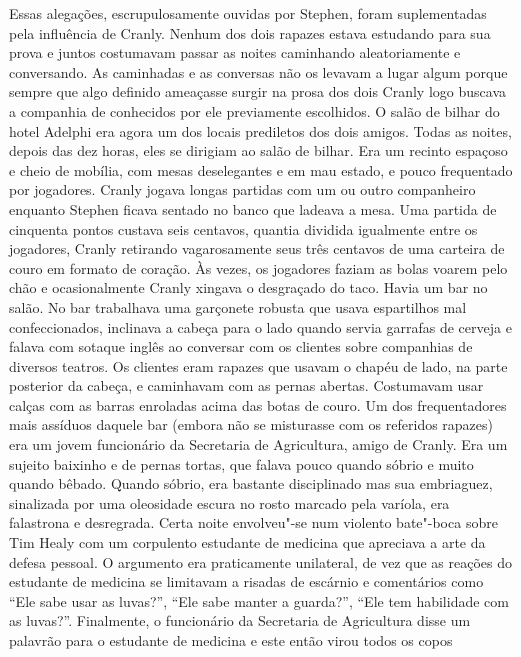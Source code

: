 Essas alegações, escrupulosamente ouvidas por Stephen, foram
suplementadas pela influência de Cranly.  Nenhum dos dois rapazes
estava estudando para sua prova e juntos costumavam
passar as noites caminhando aleatoriamente e conversando.  As
caminhadas e as conversas não os levavam a lugar algum porque sempre
que algo definido ameaçasse surgir na prosa dos dois Cranly logo
buscava a companhia de conhecidos por ele previamente escolhidos.  O
salão de bilhar do hotel Adelphi era agora um dos locais prediletos dos
dois amigos.  Todas as noites, depois das dez horas, eles se dirigiam
ao salão de bilhar.  Era um recinto espaçoso e cheio de mobília, com
mesas deselegantes e em mau estado, e pouco frequentado por jogadores. 
Cranly jogava longas partidas com um ou outro companheiro enquanto
Stephen ficava sentado no banco que ladeava a mesa.  Uma partida de
cinquenta pontos custava seis centavos, quantia dividida igualmente
entre os jogadores, Cranly retirando \label{vagarosamente"-seus} vagarosamente seus três centavos
de uma carteira de couro em formato de coração.  Às vezes, os jogadores
faziam as bolas voarem pelo chão e ocasionalmente Cranly xingava o
desgraçado do taco.  Havia um bar no salão.  No bar trabalhava uma
garçonete robusta que usava espartilhos mal confeccionados, inclinava a
cabeça para o lado quando servia garrafas de cerveja e falava com
sotaque inglês ao conversar com os clientes sobre companhias de
diversos teatros.  Os clientes eram rapazes que usavam o chapéu de
lado, na parte posterior da cabeça, e caminhavam com as pernas abertas.
 Costumavam usar calças com as barras enroladas acima das botas de
couro.  Um dos frequentadores mais assíduos daquele bar (embora não se
misturasse com os referidos rapazes) era um jovem funcionário da
Secretaria de Agricultura, amigo de Cranly.  Era um sujeito baixinho e
de pernas tortas, que falava pouco quando sóbrio e muito quando bêbado.
 Quando sóbrio, era bastante disciplinado mas sua embriaguez,
sinalizada por uma oleosidade escura no rosto marcado pela varíola, era
falastrona e desregrada.  Certa noite envolveu"-se num violento
bate"-boca sobre Tim Healy com um corpulento estudante de medicina que
apreciava a arte da defesa pessoal.  O argumento era praticamente
unilateral, de vez que as reações do estudante de medicina se limitavam
a risadas de escárnio e comentários como “Ele sabe usar as luvas?”, 
“Ele sabe manter a guarda?”, “Ele tem habilidade com as luvas?”. 
Finalmente, o funcionário da Secretaria de Agricultura disse um
palavrão para o estudante de medicina e este então virou todos os copos
